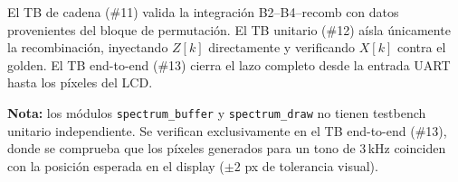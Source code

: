 \documentclass[12pt, a4paper]{article}
\begin{document}
El TB de cadena (\#11) valida la integración B2--B4--recomb con datos
provenientes del bloque de permutación. El TB unitario (\#12) aísla
únicamente la recombinación, inyectando $Z[k]$ directamente y verificando
$X[k]$ contra el golden. El TB end-to-end (\#13) cierra el lazo completo
desde la entrada UART hasta los píxeles del LCD.

\textbf{Nota:} los módulos \texttt{spectrum\_buffer} y
\texttt{spectrum\_draw} no tienen testbench unitario independiente. Se
verifican exclusivamente en el TB end-to-end (\#13), donde se comprueba que
los píxeles generados para un tono de 3\,kHz coinciden con la posición
esperada en el display ($\pm 2$ px de tolerancia visual).
\end{document}
